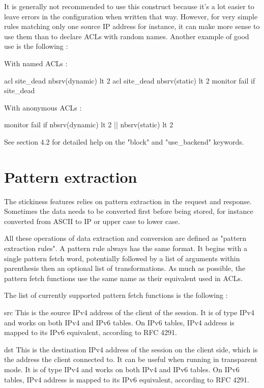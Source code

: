 It is generally not recommended to use this construct because it's a lot easier
to leave errors in the configuration when written that way. However, for very
simple rules matching only one source IP address for instance, it can make more
sense to use them than to declare ACLs with random names. Another example of
good use is the following :

   With named ACLs :

        acl site_dead nbsrv(dynamic) lt 2
        acl site_dead nbsrv(static)  lt 2
        monitor fail  if site_dead

   With anonymous ACLs :

        monitor fail if { nbsrv(dynamic) lt 2 } || { nbsrv(static) lt 2 }

See section 4.2 for detailed help on the "block" and "use_backend" keywords.


\section{Pattern extraction}

The stickiness features relies on pattern extraction in the request and
response. Sometimes the data needs to be converted first before being stored,
for instance converted from ASCII to IP or upper case to lower case.

All these operations of data extraction and conversion are defined as
"pattern extraction rules". A pattern rule always has the same format. It
begins with a single pattern fetch word, potentially followed by a list of
arguments within parenthesis then an optional list of transformations. As
much as possible, the pattern fetch functions use the same name as their
equivalent used in ACLs.

The list of currently supported pattern fetch functions is the following :

  src          This is the source IPv4 address of the client of the session.
               It is of type IPv4 and works on both IPv4 and IPv6 tables.
               On IPv6 tables, IPv4 address is mapped to its IPv6 equivalent,
               according to RFC 4291.

  dst          This is the destination IPv4 address of the session on the
               client side, which is the address the client connected to.
               It can be useful when running in transparent mode. It is of
               type IPv4 and works on both IPv4 and IPv6 tables.
               On IPv6 tables, IPv4 address is mapped to its IPv6 equivalent,
               according to RFC 4291.

